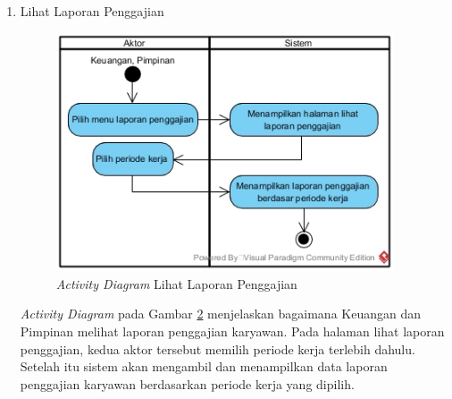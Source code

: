 \begin{enumerate}
\begin{enumerate}[label=\alph*.]
\begin{figure}[H]
            		    \caption{\emph{Activity Diagram} Cetak Slip Gaji}
            		    \label{activity_cetak_slip}
            		\end{figure}
            		\emph{Activity Diagram} pada Gambar \ref{activity_cetak_slip} menjelaskan bagaimana karyawan melakukan proses cetak slip gaji. Pada halaman cetak slip gaji, karyawan memilih periode kerja terlebih dahulu dan klik cetak slip gaji. Kemudian sistem akan mengambil data slip gaji berdasarkan periode yang dipilih dan melakukan \emph{export} data slip gaji tersebut.
            		\newpage
            		\item Lihat Laporan Penggajian
            		\begin{figure}[H]
            		    \centering
            		    \includegraphics[width=10cm]{gambar/activity/lihat-laporan-penggajian}
            		    \caption{\emph{Activity Diagram} Lihat Laporan Penggajian}
            		    \label{activity_laporan_penggajian}
            		\end{figure}
            		\emph{Activity Diagram} pada Gambar \ref{activity_laporan_penggajian} menjelaskan bagaimana Keuangan dan Pimpinan melihat laporan penggajian karyawan. Pada halaman lihat laporan penggajian, kedua aktor tersebut memilih periode kerja terlebih dahulu. Setelah itu sistem akan mengambil dan menampilkan data laporan penggajian karyawan berdasarkan periode kerja yang dipilih.
                \end{enumerate}
			\end{enumerate}
			
			
